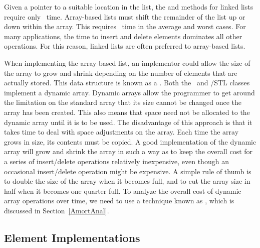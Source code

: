 Given a pointer to a suitable location in the list,
the  and
 methods for linked lists
require only \Thetaone\ time.
Array-based lists must shift the remainder of the list up or down
within the array.
This requires \Thetan\ time in the average and worst cases.
For many applications, the time to insert and delete elements
dominates all other operations.
For this reason, linked lists are often preferred to array-based
lists.

When implementing the array-based list, an implementor could
allow the size of the array to grow and shrink depending on the number 
of elements that are actually stored.
This data structure is known as a
.
Both the \LangJava\ and \LangCPP/STL  classes implement a
dynamic array.
Dynamic arrays allow the programmer to get around the limitation on
the standard array that its size cannot be changed once the array has
been created.
This also means that space need not be allocated to the dynamic array
until it is to be used.
The disadvantage of this approach is that it takes time to deal
with space adjustments on the array.
Each time the array grows in size, its contents must be copied.
A good implementation of the dynamic array will grow and shrink
the array in such a way as to keep the overall cost for a series of
insert/delete operations relatively inexpensive, even though an
occasional insert/delete operation might be expensive.
A simple rule of thumb is to double the size of the array when it
becomes full, and to cut the array size in half when it becomes one
quarter full.
To analyze the overall cost of dynamic array operations over time,
we need to use a technique known as
,
which is discussed in Section~\ref{AmortAnal}.

\subsection{Element Implementations}

